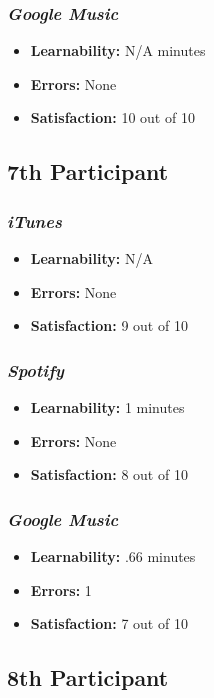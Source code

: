 \documentclass{article}
\begin{document}
{\begin{multicols}{2}
\subsubsection{\it Google Music}
\begin{itemize}
\item {\bf Learnability:} N/A minutes
	\item {\bf Errors:} None
	\item {\bf Satisfaction:} 10 out of 10 
\end{itemize}

\subsection{7th Participant}

\subsubsection{\it iTunes}
\begin{itemize}
	\item {\bf Learnability:} N/A
	\item {\bf Errors:}  None
	\item {\bf Satisfaction:} 9 out of 10 
\end{itemize}

\subsubsection{\it Spotify}
\begin{itemize}
	\item {\bf Learnability:} 1 minutes
	\item {\bf Errors:} None
	\item {\bf Satisfaction:} 8 out of 10 
\end{itemize}

\subsubsection{\it Google Music}
\begin{itemize}
\item {\bf Learnability:} .66 minutes
	\item {\bf Errors:} 1
	\item {\bf Satisfaction:} 7 out of 10 
\end{itemize}

\subsection{8th Participant}


\end{multicols}}
\end{document}

